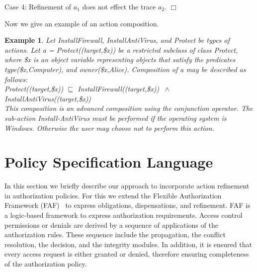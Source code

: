 \documentclass[12pt,journal,letterpaper,onecolumn]{IEEEtran}
\newtheorem{example}{Example}[section]
\begin{document}
\noindent Case 4: Refinement of $a_1$ does not effect the trace
$a_2$. \hfill$\Box$







Now we give an example of an action composition.
\begin{example}  Let  {\ttfamily InstallFirewall},   {\ttfamily InstallAntiVirus}, and
 {\ttfamily Protect} be types of actions. Let  {\ttfamily a = Protect((target,\$x))} be a
restricted subclass of class  {\ttfamily Protect}, where {\ttfamily
\$x} is an object variable representing objects that satisfy the
predicates  {\ttfamily type(\$x,Computer)}, and {\ttfamily
owner(\$x,Alice)}. Composition of  {\ttfamily a}
may be described as follows: \\
 {\ttfamily Protect((target,\$x))} $\sqsubseteq$
 {\ttfamily InstallFirewall((target,\$x))} $~ \wedge ~$ \\
\indent \indent \indent \indent \indent \indent \indent
 {\ttfamily [\$x((os,Windows))]InstallAntiVirus((target,\$x))}\\
This composition is an advanced composition using the conjunction
operator. The sub-action  {\ttfamily Install}-{\ttfamily AntiVirus} must be
performed if the operating system is Windows. Otherwise the user may
choose not to perform this action. \label{eg:actionrefinement}
\end{example}


\section{Policy Specification Language}
\label{sec:language} In this section we briefly describe our
approach to incorporate action refinement in authorization policies.
For this we extend the Flexible Authorization Framework
(FAF)~\cite{Jajodia01} to express obligations,
dispensations, and refinement.
FAF is a logic-based framework to express authorization requirements.
Access control permissions or denials are derived by a sequence of applications
of the authorization rules.  These sequence include the propagation, the conflict
resolution, the decision, and the integrity modules.  In addition, it is ensured
that every access request is either granted or denied, therefore ensuring completeness
of the authorization policy.
\end{document}
